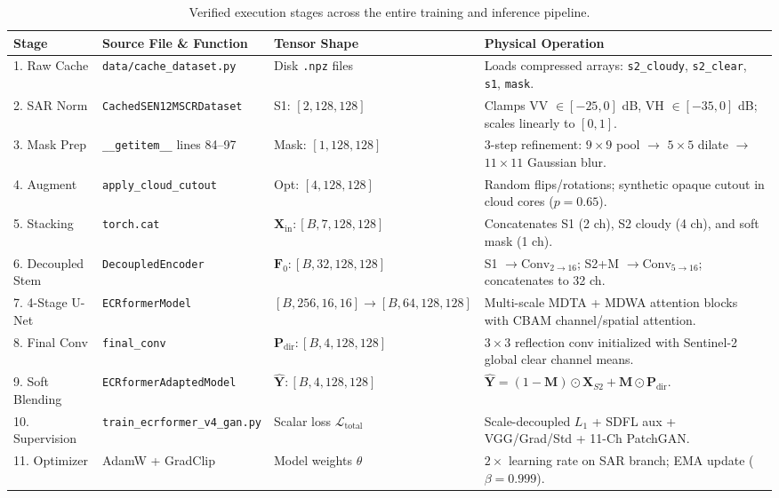 \begin{table}[htbp]
\centering
\small
\begin{tabularx}{\textwidth}{llp{3.2cm}X}
\toprule
\textbf{Stage} & \textbf{Source File \& Function} & \textbf{Tensor Shape} & \textbf{Physical Operation} \\
\midrule
1. Raw Cache & \texttt{data/cache\_dataset.py} & Disk \texttt{.npz} files & Loads compressed arrays: \texttt{s2\_cloudy}, \texttt{s2\_clear}, \texttt{s1}, \texttt{mask}. \\
2. SAR Norm & \texttt{CachedSEN12MSCRDataset} & S1: $[2, 128, 128]$ & Clamps VV $\in [-25, 0]$ dB, VH $\in [-35, 0]$ dB; scales linearly to $[0, 1]$. \\
3. Mask Prep & \texttt{\_\_getitem\_\_} lines 84--97 & Mask: $[1, 128, 128]$ & 3-step refinement: $9\times 9$ pool $\to$ $5\times 5$ dilate $\to$ $11\times 11$ Gaussian blur. \\
4. Augment & \texttt{apply\_cloud\_cutout} & Opt: $[4, 128, 128]$ & Random flips/rotations; synthetic opaque cutout in cloud cores ($p=0.65$). \\
5. Stacking & \texttt{torch.cat} & $\mathbf{X}_{\text{in}}: [B, 7, 128, 128]$ & Concatenates S1 (2 ch), S2 cloudy (4 ch), and soft mask (1 ch). \\
6. Decoupled Stem & \texttt{DecoupledEncoder} & $\mathbf{F}_0: [B, 32, 128, 128]$ & S1 $\to \text{Conv}_{2\to 16}$; S2+M $\to \text{Conv}_{5\to 16}$; concatenates to 32 ch. \\
7. 4-Stage U-Net & \texttt{ECRformerModel} & $[B, 256, 16, 16] \to [B, 64, 128, 128]$ & Multi-scale MDTA + MDWA attention blocks with CBAM channel/spatial attention. \\
8. Final Conv & \texttt{final\_conv} & $\mathbf{P}_{\text{dir}}: [B, 4, 128, 128]$ & $3\times 3$ reflection conv initialized with Sentinel-2 global clear channel means. \\
9. Soft Blending & \texttt{ECRformerAdaptedModel} & $\hat{\mathbf{Y}}: [B, 4, 128, 128]$ & $\hat{\mathbf{Y}} = (1 - \mathbf{M}) \odot \mathbf{X}_{S2} + \mathbf{M} \odot \mathbf{P}_{\text{dir}}$. \\
10. Supervision & \texttt{train\_ecrformer\_v4\_gan.py} & Scalar loss $\mathcal{L}_{\text{total}}$ & Scale-decoupled $L_1$ + SDFL aux + VGG/Grad/Std + 11-Ch PatchGAN. \\
11. Optimizer & AdamW + GradClip & Model weights $\theta$ & $2\times$ learning rate on SAR branch; EMA update ($\beta=0.999$). \\
\bottomrule
\end{tabularx}
\caption{Verified execution stages across the entire training and inference pipeline.}
\label{tab:pipeline_stages}
\end{table}

